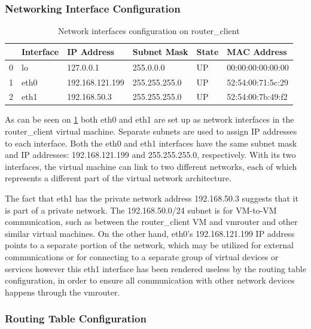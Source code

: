 \documentclass[12pt, fleqn, a4paper]{article}
\begin{document}
\subsubsection{Networking Interface Configuration}
\begin{table}[H]
	\caption{Network interfaces configuration on router\_client}
	\centering
  \begin{tabular}{llllll}
\toprule
{} & Interface &       IP Address &    Subnet Mask & State &        MAC Address \\
\midrule
0 &        lo &        127.0.0.1 &      255.0.0.0 &    UP &  00:00:00:00:00:00 \\
1 &      eth0 &  192.168.121.199 &  255.255.255.0 &    UP &  52:54:00:71:5c:29 \\
2 &      eth1 &     192.168.50.3 &  255.255.255.0 &    UP &  52:54:00:7b:49:f2 \\
\bottomrule
\end{tabular}
  \label{tab:routerslave1}
\end{table}
As can be seen on \cref{tab:routerslave1} both eth0 and eth1 are set up as network interfaces in the router\_client virtual machine. Separate subnets are used to assign IP addresses to each interface. Both the eth0 and eth1 interfaces have the same subnet mask and IP addresses: 192.168.121.199 and 255.255.255.0, respectively. With its two interfaces, the virtual machine can link to two different networks, each of which represents a different part of the virtual network architecture.

The fact that eth1 has the private network address 192.168.50.3 suggests that it is part of a private network. The 192.168.50.0/24 subnet is for VM-to-VM communication, such as between the router\_client VM and vmrouter and other similar virtual machines. On the other hand, eth0's 192.168.121.199 IP address points to a separate portion of the network, which may be utilized for external communications or for connecting to a separate group of virtual devices or services however this eth1 interface has been rendered useless by the routing table configuration, in order to ensure all communication with other network devices happens through the vmrouter.

\subsubsection{Routing Table Configuration}
\end{document}
